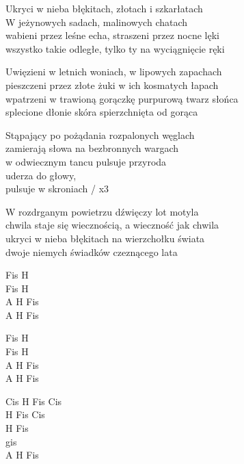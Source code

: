 \begin{text}
    \begin{smallTwo}
    Ukryci w nieba błękitach, złotach i szkarłatach\\
    W jeżynowych sadach, malinowych chatach\\
    wabieni przez leśne echa, straszeni przez nocne lęki\\
    wszystko takie odległe, tylko ty na wyciągnięcie ręki

    Uwięzieni w letnich woniach, w lipowych zapachach\\
    pieszczeni przez złote żuki w ich kosmatych łapach\\
    wpatrzeni w trawioną gorączkę purpurową twarz słońca\\
    splecione dłonie skóra spierzchnięta od gorąca

    Stąpający po pożądania rozpalonych węglach\\
    zamierają słowa na bezbronnych wargach\\
    w odwiecznym tancu pulsuje przyroda\\
    uderza do głowy,\\
    pulsuje w skroniach / x3

    W rozdrganym powietrzu dźwięczy lot motyla\\
    chwila staje się wiecznością, a wieczność jak chwila\\
    ukryci w nieba błękitach na wierzchołku świata\\
    dwoje niemych świadków czeznącego lata
\end{smallTwo}
\end{text}
\begin{chord}
    \begin{smallTwo}
    Fis H\\
    Fis H\\
    A H Fis\\
    A H Fis

    Fis H\\
    Fis H\\
    A H Fis\\
    A H Fis

    Cis H Fis Cis\\
    H Fis Cis\\
    H Fis\\
    gis\\
    A H Fis
\end{smallTwo}
\end{chord}